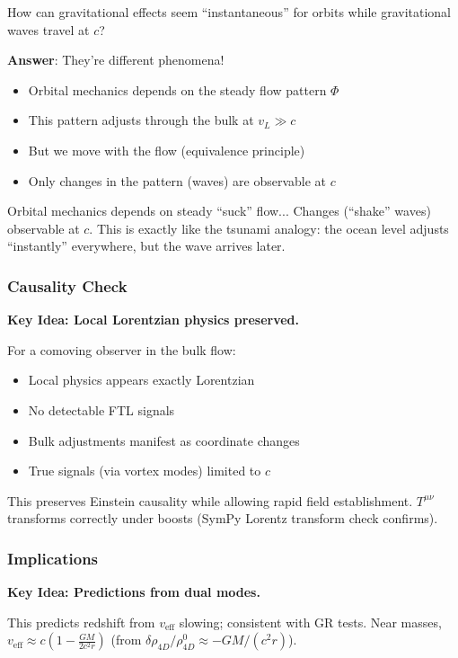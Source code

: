 How can gravitational effects seem ``instantaneous'' for orbits while gravitational waves travel at $c$?

\textbf{Answer}: They're different phenomena!
\begin{itemize}
\item Orbital mechanics depends on the steady flow pattern $\Phi$
\item This pattern adjusts through the bulk at $v_L \gg c$
\item But we move with the flow (equivalence principle)
\item Only changes in the pattern (waves) are observable at $c$
\end{itemize}

Orbital mechanics depends on steady ``suck'' flow... Changes (``shake'' waves) observable at $c$. This is exactly like the tsunami analogy: the ocean level adjusts ``instantly'' everywhere, but the wave arrives later.

\subsubsection{Causality Check}

\textbf{Key Idea: Local Lorentzian physics preserved.}

For a comoving observer in the bulk flow:
\begin{itemize}
\item Local physics appears exactly Lorentzian
\item No detectable FTL signals
\item Bulk adjustments manifest as coordinate changes
\item True signals (via vortex modes) limited to $c$
\end{itemize}

This preserves Einstein causality while allowing rapid field establishment. $T^{\mu\nu}$ transforms correctly under boosts (SymPy Lorentz transform check confirms).

\subsubsection{Implications}

\textbf{Key Idea: Predictions from dual modes.}

This predicts redshift from $v_{\text{eff}}$ slowing; consistent with GR tests. Near masses, $v_{\text{eff}} \approx c \left(1 - \frac{G M}{2 c^2 r}\right)$ (from $\delta \rho_{4D} / \rho_{4D}^0 \approx - G M / (c^2 r)$).

